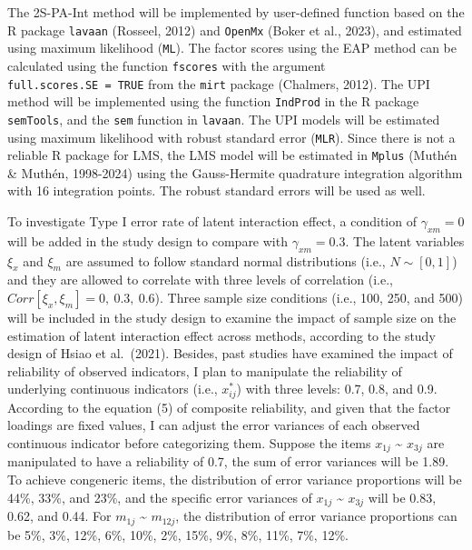 \documentclass[
  man]{apa6}
\begin{document}
The 2S-PA-Int method will be implemented by user-defined function based on the R package \texttt{lavaan} (Rosseel, 2012) and \texttt{OpenMx} (Boker et al., 2023), and estimated using maximum likelihood (\texttt{ML}). The factor scores using the EAP method can be calculated using the function \texttt{fscores} with the argument \texttt{full.scores.SE\ =\ TRUE} from the \texttt{mirt} package (Chalmers, 2012). The UPI method will be implemented using the function \texttt{IndProd} in the R package \texttt{semTools}, and the \texttt{sem} function in \texttt{lavaan}. The UPI models will be estimated using maximum likelihood with robust standard error (\texttt{MLR}). Since there is not a reliable R package for LMS, the LMS model will be estimated in \texttt{Mplus} (Muthén \& Muthén, 1998-2024) using the Gauss-Hermite quadrature integration algorithm with 16 integration points. The robust standard errors will be used as well.

To investigate Type I error rate of latent interaction effect, a condition of \(\gamma_{xm} = 0\) will be added in the study design to compare with \(\gamma_{xm} = 0.3\). The latent variables \(\xi_{x}\) and \(\xi_{m}\) are assumed to follow standard normal distributions (i.e., \(N \sim [0,1]\)) and they are allowed to correlate with three levels of correlation (i.e., \(Corr[\xi_{x}, \xi_{m}] = 0, \ 0.3, \ 0.6\)). Three sample size conditions (i.e., 100, 250, and 500) will be included in the study design to examine the impact of sample size on the estimation of latent interaction effect across methods, according to the study design of Hsiao et al.~(2021). Besides, past studies have examined the impact of reliability of observed indicators, I plan to manipulate the reliability of underlying continuous indicators (i.e., \(x_{ij}^*\)) with three levels: 0.7, 0.8, and 0.9. According to the equation (5) of composite reliability, and given that the factor loadings are fixed values, I can adjust the error variances of each observed continuous indicator before categorizing them. Suppose the items \(x_{1j}\) \textasciitilde{} \(x_{3j}\) are manipulated to have a reliability of 0.7, the sum of error variances will be 1.89. To achieve congeneric items, the distribution of error variance proportions will be 44\%, 33\%, and 23\%, and the specific error variances of \(x_{1j}\) \textasciitilde{} \(x_{3j}\) will be 0.83, 0.62, and 0.44. For \(m_{1j}\) \textasciitilde{} \(m_{12j}\), the distribution of error variance proportions can be 5\%, 3\%, 12\%, 6\%, 10\%, 2\%, 15\%, 9\%, 8\%, 11\%, 7\%, 12\%.
\end{document}
